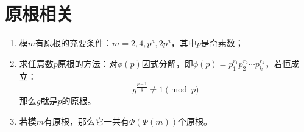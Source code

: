 \section{原根相关}
	\begin{enumerate}
		\item 模$m$有原根的充要条件：$m = 2, 4, p^a, 2p^a$，其中$p$是奇素数；
		\item 求任意数$p$原根的方法：对$\phi(p)$因式分解，即$\phi(p) = p_1^{r_1}p_2^{r_2}\cdots p_k^{r_k}$，若恒成立：
			\[g^{\frac{p - 1}{g}} \neq 1 \pmod{p}\]
				那么$g$就是$p$的原根。
		\item 若模$m$有原根，那么它一共有$\Phi(\Phi(m))$个原根。
	\end{enumerate}
